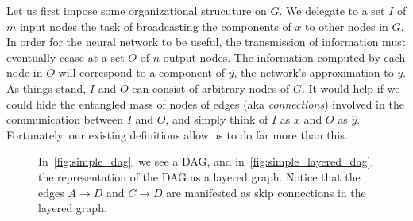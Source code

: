 \documentclass[11pt,a4paper]{article}
\numberwithin{equation}{section}
\begin{document}
Let us first impose some organizational strucuture on $G$. We delegate to a set
$I$ of $m$ input nodes the task of broadcasting the components of $x$ to other
nodes in $G$. In order for the neural network to be useful, the transmission of
information must eventually cease at a set $O$ of $n$ output nodes. The
information computed by each node in $O$ will correspond to a component of
$\hat{y}$, the network's approximation to $y$. As things stand, $I$ and $O$ can
consist of arbitrary nodes of $G$. It would help if we could hide the entangled
mass of nodes of edges (aka \emph{connections}) involved in the communication
between $I$ and $O$, and simply think of $I$ as $x$ and $O$ as $\hat{y}$.
Fortunately, our existing definitions allow us to do far more than this.

\begin{figure}
\centering
\begin{minipage}[t]{0.4\linewidth}
	\centering
	\subcaption{}\label{fig:simple_dag}
\end{minipage}
\begin{minipage}[t]{0.4\linewidth}
	\centering
	\subcaption{}\label{fig:simple_layered_dag}
\end{minipage}
\caption{In~\ref{fig:simple_dag}, we see a DAG, and
in~\ref{fig:simple_layered_dag}, the representation of the DAG as a layered
graph. Notice that the edges $A \rightarrow D$ and $C \rightarrow D$ are
manifested as skip connections in the layered
graph.\label{fig:layered_graph_drawing}}
\end{figure}
\end{document}
